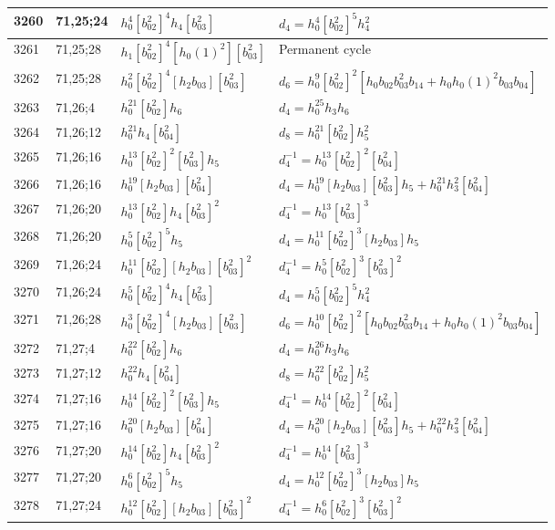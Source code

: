 \documentclass{article}
\begin{document}
\begin{longtable}{|l|l|>{\raggedright\arraybackslash}p{6cm}|>{\raggedright\arraybackslash}p{6cm}|}
3260 & 71,25;24 & $h_0^4[b_{02}^2]^4h_4[b_{03}^2]$ &$d_{4}=h_0^4[b_{02}^2]^5h_4^2$\\
\hline
3261 & 71,25;28 & $h_1[b_{02}^2]^4[h_0(1)^2][b_{03}^2]$ & Permanent cycle\\
3262 & 71,25;28 & $h_0^2[b_{02}^2]^4[h_2b_{03}][b_{03}^2]$ &$d_{6}=h_0^9[b_{02}^2]^2[h_0b_{02}b_{03}^2b_{14} + h_0h_0(1)^2b_{03}b_{04}]$\\
\hline
3263 & 71,26;4 & $h_0^{21}[b_{02}^2]h_6$ &$d_{4}=h_0^{25}h_3h_6$\\
\hline
3264 & 71,26;12 & $h_0^{21}h_4[b_{04}^2]$ &$d_{8}=h_0^{21}[b_{02}^2]h_5^2$\\
\hline
3265 & 71,26;16 & $h_0^{13}[b_{02}^2]^2[b_{03}^2]h_5$ & $d_{4}^{-1}=h_0^{13}[b_{02}^2]^2[b_{04}^2]$\\
3266 & 71,26;16 & $h_0^{19}[h_2b_{03}][b_{04}^2]$ &$d_{4}=h_0^{19}[h_2b_{03}][b_{03}^2]h_5 + h_0^{21}h_3^2[b_{04}^2]$\\
\hline
3267 & 71,26;20 & $h_0^{13}[b_{02}^2]h_4[b_{03}^2]^2$ & $d_{4}^{-1}=h_0^{13}[b_{03}^2]^3$\\
3268 & 71,26;20 & $h_0^5[b_{02}^2]^5h_5$ &$d_{4}=h_0^{11}[b_{02}^2]^3[h_2b_{03}]h_5$\\
\hline
3269 & 71,26;24 & $h_0^{11}[b_{02}^2][h_2b_{03}][b_{03}^2]^2$ & $d_{4}^{-1}=h_0^5[b_{02}^2]^3[b_{03}^2]^2$\\
3270 & 71,26;24 & $h_0^5[b_{02}^2]^4h_4[b_{03}^2]$ &$d_{4}=h_0^5[b_{02}^2]^5h_4^2$\\
\hline
3271 & 71,26;28 & $h_0^3[b_{02}^2]^4[h_2b_{03}][b_{03}^2]$ &$d_{6}=h_0^{10}[b_{02}^2]^2[h_0b_{02}b_{03}^2b_{14} + h_0h_0(1)^2b_{03}b_{04}]$\\
\hline
3272 & 71,27;4 & $h_0^{22}[b_{02}^2]h_6$ &$d_{4}=h_0^{26}h_3h_6$\\
\hline
3273 & 71,27;12 & $h_0^{22}h_4[b_{04}^2]$ &$d_{8}=h_0^{22}[b_{02}^2]h_5^2$\\
\hline
3274 & 71,27;16 & $h_0^{14}[b_{02}^2]^2[b_{03}^2]h_5$ & $d_{4}^{-1}=h_0^{14}[b_{02}^2]^2[b_{04}^2]$\\
3275 & 71,27;16 & $h_0^{20}[h_2b_{03}][b_{04}^2]$ &$d_{4}=h_0^{20}[h_2b_{03}][b_{03}^2]h_5 + h_0^{22}h_3^2[b_{04}^2]$\\
\hline
3276 & 71,27;20 & $h_0^{14}[b_{02}^2]h_4[b_{03}^2]^2$ & $d_{4}^{-1}=h_0^{14}[b_{03}^2]^3$\\
3277 & 71,27;20 & $h_0^6[b_{02}^2]^5h_5$ &$d_{4}=h_0^{12}[b_{02}^2]^3[h_2b_{03}]h_5$\\
\hline
3278 & 71,27;24 & $h_0^{12}[b_{02}^2][h_2b_{03}][b_{03}^2]^2$ & $d_{4}^{-1}=h_0^6[b_{02}^2]^3[b_{03}^2]^2$\\

\end{longtable}
\end{document}
